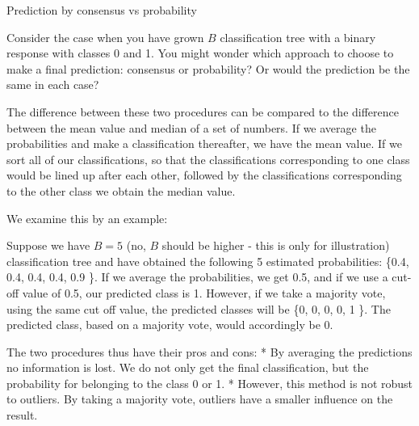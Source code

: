 \documentclass[
  ignorenonframetext,
]{beamer}
\begin{document}
\begin{frame}

\begin{block}{Prediction by consensus vs probability}

Consider the case when you have grown \(B\) classification tree with a
binary response with classes 0 and 1. You might wonder which approach to
choose to make a final prediction: consensus or probability? Or would
the prediction be the same in each case?

The difference between these two procedures can be compared to the
difference between the mean value and median of a set of numbers. If we
average the probabilities and make a classification thereafter, we have
the mean value. If we sort all of our classifications, so that the
classifications corresponding to one class would be lined up after each
other, followed by the classifications corresponding to the other class
we obtain the median value.

\end{block}

\end{frame}

\begin{frame}

We examine this by an example:

Suppose we have \(B=5\) (no, \(B\) should be higher - this is only for
illustration) classification tree and have obtained the following 5
estimated probabilities: \{0.4, 0.4, 0.4, 0.4, 0.9 \}. If we average the
probabilities, we get 0.5, and if we use a cut-off value of 0.5, our
predicted class is 1. However, if we take a majority vote, using the
same cut off value, the predicted classes will be \{0, 0, 0, 0, 1 \}.
The predicted class, based on a majority vote, would accordingly be 0.

The two procedures thus have their pros and cons: * By averaging the
predictions no information is lost. We do not only get the final
classification, but the probability for belonging to the class 0 or 1. *
However, this method is not robust to outliers. By taking a majority
vote, outliers have a smaller influence on the result.

\end{frame}
\end{document}
